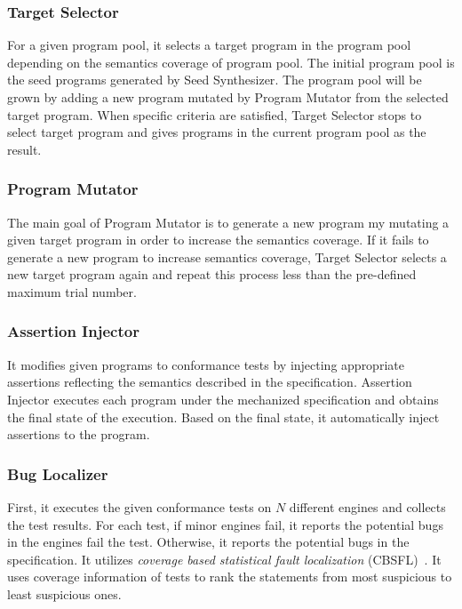 \subsubsection{Target Selector}
For a given program pool, it selects a target program in the program pool
depending on the semantics coverage of program pool.  The initial program pool
is the seed programs generated by \textsf{Seed Synthesizer}. The program pool
will be grown by adding a new program mutated by \textsf{Program Mutator} from
the selected target program.  When specific criteria are satisfied,
\textsf{Target Selector} stops to select target program and gives programs in
the current program pool as the result.
\newline

\subsubsection{Program Mutator}
The main goal of \textsf{Program Mutator} is to generate a new program my
mutating a given target program in order to increase the semantics coverage.
If it fails to generate a new program to increase semantics coverage,
\textsf{Target Selector} selects a new target program again and repeat this
process less than the pre-defined maximum trial number.
\newline

\subsubsection{Assertion Injector}
It modifies given programs to conformance tests by injecting appropriate
assertions reflecting the semantics described in the specification.
\textsf{Assertion Injector} executes each program under the mechanized
specification and obtains the final state of the execution.  Based on the final
state, it automatically inject assertions to the program.
\newline

\subsubsection{Bug Localizer}
First, it executes the given conformance tests on $N$ different engines and
collects the test results.  For each test, if minor engines fail,
it reports the potential bugs in the engines fail the test.  Otherwise, it
reports the potential bugs in the specification.  It utilizes \textit{coverage
based statistical fault localization} (CBSFL)~\cite{fault-local}.  It uses coverage
information of tests to rank the statements from most suspicious to least
suspicious ones.

